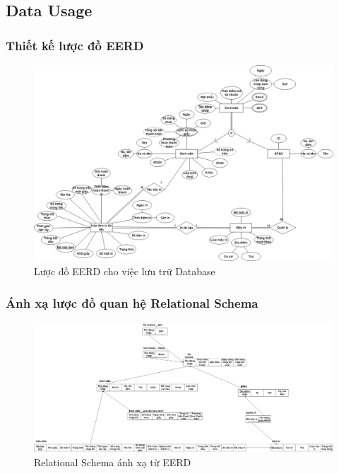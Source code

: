 \documentclass[a4paper]{article}
\begin{document}
\newpage
\subsection{Data Usage}
\subsubsection{Thiết kế lược đồ EERD}
\begin{figure}[h!]
    \includegraphics[scale = 0.35]{picture/eerd.png}
    \caption{Lược đồ EERD cho việc lưu trữ Database}
\end{figure}
\newpage
\subsubsection{Ánh xạ lược đồ quan hệ Relational Schema}
\begin{figure}[h!]
    \includegraphics[scale = 0.2]{picture/relationalschema.png}
    \caption{Relational Schema ánh xạ từ EERD}
\end{figure}
\end{document}
